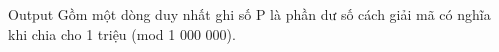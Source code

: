 Output
Gồm một dòng duy nhất ghi số P là phần dư số cách giải mã có nghĩa khi chia cho 1 triệu (mod 1 000 000).